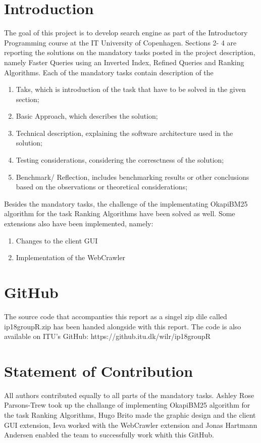 \section{Introduction}
\label{sec:Introduction}
The goal of this project is to develop search engine as part of the Introductory Programming course at the IT University of Copenhagen. Sections 2- 4 are reporting the solutions on the mandatory tasks posted in the project description, namely Faster Queries using an Inverted Index, Refined Queries and Ranking Algorithms. Each of the mandatory tasks contain description of the\\ 

\begin{enumerate}
\item Taks, which is introduction of the task that have to be solved in the given section;
\item Basic Approach, which describes the solution;
\item Technical description, explaining the software architecture used in the solution;
\item Testing considerations, considering the corresctness of the solution;
\item  Benchmark/ Reflection, includes benchmarking results or other conclusions based on the observations or theoretical considerations;
\end{enumerate}

Besides the mandatory tasks, the challenge of the implementating OkapiBM25 algorithm for the task Ranking Algorithms have been solved as well. Some extensions also have been implemented, namely:
\begin{enumerate}
    \item Changes to the client GUI
    \item Implementation of the WebCrawler
\end{enumerate}

\section{GitHub}
\label{sec:GitHub}

The source code that accompanties this report as a singel zip dile called ip18groupR.zip has been handed alongside with this report. 
The code is also available on ITU's GitHub: https://github.itu.dk/wilr/ip18groupR

\section{Statement of Contribution}
\label{sec:Statement of Contribution}
All authors contributed equally to all parts of the mandatory tasks. Ashley Rose Parsons-Trew took up the challange of implementing OkapiBM25 algorithm for the task Ranking Algorithms, Hugo Brito made the graphic design and the client GUI extension, Ieva worked with the WebCrawler extension and Jonas Hartmann Andersen enabled the team to successfully work whith this GitHub.